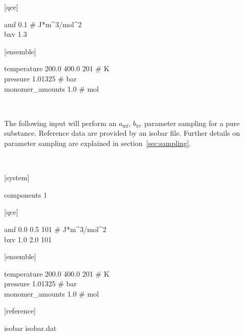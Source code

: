 \documentclass{scrartcl}
\newcommand{\amf}{a_\mathrm{mf}}
\newcommand{\bxv}{b_\mathrm{xv}}
\begin{document}
\begin{addmargin}[1cm]{0cm}
    \ttfamily
    \begin{minipage}{\textwidth}
        [qce]
        \begin{addmargin}[1cm]{0cm}
            amf 0.1 \# J*m\^{}3/mol\^{}2 \\
            bxv 1.3
        \end{addmargin}
    \end{minipage}

    \begin{minipage}{\textwidth}
        [ensemble]
        \begin{addmargin}[1cm]{0cm}
            temperature 200.0 400.0 201 \# K \\
            pressure 1.01325 \# bar \\
            monomer\_amounts 1.0 \# mol
        \end{addmargin}
    \end{minipage}
\end{addmargin}

\

The following input will perform an $\amf$, $\bxv$ parameter sampling for a pure substance.
Reference data are provided by an isobar file.
Further details on parameter sampling are explained in section~\vref{sec:sampling}.

\

\begin{addmargin}[1cm]{0cm}
    \ttfamily
    \begin{minipage}{\textwidth}
        [system]
        \begin{addmargin}[1cm]{0cm}
            components 1
        \end{addmargin}
    \end{minipage}

    \begin{minipage}{\textwidth}
        [qce]
        \begin{addmargin}[1cm]{0cm}
            amf 0.0 0.5 101 \# J*m\^{}3/mol\^{}2 \\
            bxv 1.0 2.0 101
        \end{addmargin}
    \end{minipage}

    \begin{minipage}{\textwidth}
        [ensemble]
        \begin{addmargin}[1cm]{0cm}
            temperature 200.0 400.0 201 \# K \\
            pressure 1.01325 \# bar \\
            monomer\_amounts 1.0 \# mol
        \end{addmargin}
    \end{minipage}

    \begin{minipage}{\textwidth}
        [reference]
        \begin{addmargin}[1cm]{0cm}
            isobar isobar.dat
        \end{addmargin}
    \end{minipage}
\end{addmargin}
\end{document}
